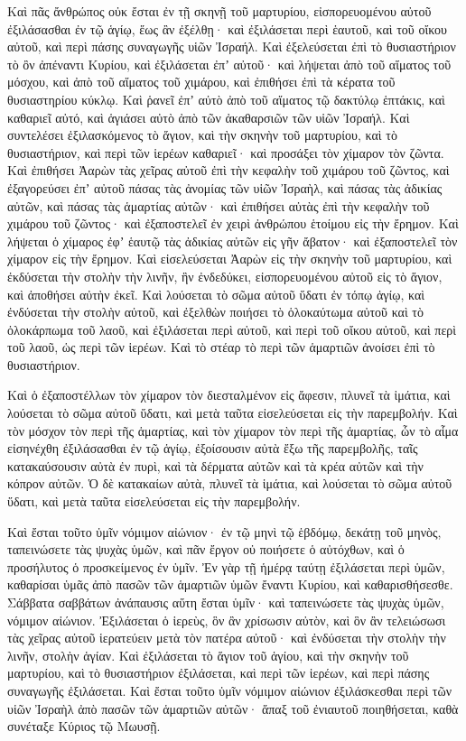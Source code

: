 {Καὶ πᾶς ἄνθρώπος οὐκ ἔσται ἐν τῇ σκηνῇ τοῦ μαρτυρίου, εἰσπορευομένου αὐτοῦ ἐξιλάσασθαι ἐν τῷ ἁγίῳ, ἕως ἂν ἐξέλθῃ· καὶ ἐξιλάσεται περὶ ἑαυτοῦ, καὶ τοῦ οἴκου αὐτοῦ, καὶ περὶ πάσης συναγωγῆς υἱῶν Ἰσραήλ.
Καὶ ἐξελεύσεται ἐπὶ τὸ θυσιαστήριον τὸ ὂν ἀπέναντι Κυρίου, καὶ ἐξιλάσεται ἐπʼ αὐτοῦ· καὶ λήψεται ἀπὸ τοῦ αἵματος τοῦ μόσχου, καὶ ἀπὸ τοῦ αἵματος τοῦ χιμάρου, καὶ ἐπιθήσει ἐπὶ τὰ κέρατα τοῦ θυσιαστηρίου κύκλῳ.
Καὶ ῥανεῖ ἐπʼ αὐτὸ ἀπὸ τοῦ αἵματος τῷ δακτύλῳ ἑπτάκις, καὶ καθαριεῖ αὐτό, καὶ ἁγιάσει αὐτὸ ἀπὸ τῶν ἀκαθαρσιῶν τῶν υἱῶν Ἰσραήλ.
Καὶ συντελέσει ἐξιλασκόμενος τὸ ἅγιον, καὶ τὴν σκηνὴν τοῦ μαρτυρίου, καὶ τὸ θυσιαστήριον, καὶ περὶ τῶν ἱερέων καθαριεῖ· καὶ προσάξει τὸν χίμαρον τὸν ζῶντα.
Καὶ ἐπιθήσει Ἀαρὼν τὰς χεῖρας αὐτοῦ ἐπὶ τὴν κεφαλὴν τοῦ χιμάρου τοῦ ζῶντος, καὶ ἐξαγορεύσει ἐπʼ αὐτοῦ πάσας τὰς ἀνομίας τῶν υἱῶν Ἰσραὴλ, καὶ πάσας τὰς ἀδικίας αὐτῶν, καὶ πάσας τὰς ἁμαρτίας αὐτῶν· καὶ ἐπιθήσει αὐτὰς ἐπὶ τὴν κεφαλὴν τοῦ χιμάρου τοῦ ζῶντος· καὶ ἐξαποστελεῖ ἐν χειρὶ ἀνθρώπου ἑτοίμου εἰς τὴν ἔρημον.
Καὶ λήψεται ὁ χίμαρος ἐφʼ ἑαυτῷ τὰς ἀδικίας αὐτῶν εἰς γῆν ἄβατον· καὶ ἐξαποστελεῖ τὸν χίμαρον εἰς τὴν ἔρημον.
Καὶ εἰσελεύσεται Ἀαρὼν εἰς τὴν σκηνὴν τοῦ μαρτυρίου, καὶ ἐκδύσεται τὴν στολὴν τὴν λινῆν, ἣν ἐνδεδύκει, εἰσπορευομένου αὐτοῦ εἰς τὸ ἅγιον, καὶ ἀποθήσει αὐτὴν ἐκεῖ.
Καὶ λούσεται τὸ σῶμα αὐτοῦ ὕδατι ἐν τόπῳ ἁγίῳ, καὶ ἐνδύσεται τὴν στολὴν αὐτοῦ, καὶ ἐξελθὼν ποιήσει τὸ ὁλοκαύτωμα αὐτοῦ καὶ τὸ ὁλοκάρπωμα τοῦ λαοῦ, καὶ ἐξιλάσεται περὶ αὐτοῦ, καὶ περὶ τοῦ οἴκου αὐτοῦ, καὶ περὶ τοῦ λαοῦ, ὡς περὶ τῶν ἱερέων.
Καὶ τὸ στέαρ τὸ περὶ τῶν ἁμαρτιῶν ἀνοίσει ἐπὶ τὸ θυσιαστήριον.
\par }{\PP {}Καὶ ὁ ἐξαποστέλλων τὸν χίμαρον τὸν διεσταλμένον εἰς ἄφεσιν, πλυνεῖ τὰ ἱμάτια, καὶ λούσεται τὸ σῶμα αὐτοῦ ὕδατι, καὶ μετὰ ταῦτα εἰσελεύσεται εἰς τὴν παρεμβολήν.
Καὶ τὸν μόσχον τὸν περὶ τῆς ἁμαρτίας, καὶ τὸν χίμαρον τὸν περὶ τῆς ἁμαρτίας, ὧν τὸ αἷμα εἰσηνέχθη ἐξιλάσασθαι ἐν τῷ ἁγίῳ, ἐξοίσουσιν αὐτὰ ἔξω τῆς παρεμβολῆς, ταῖς κατακαύσουσιν αὐτὰ ἐν πυρὶ, καὶ τὰ δέρματα αὐτῶν καὶ τὰ κρέα αὐτῶν καὶ τὴν κόπρον αὐτῶν.
Ὁ δὲ κατακαίων αὐτὰ, πλυνεῖ τὰ ἱμάτια, καὶ λούσεται τὸ σῶμα αὐτοῦ ὕδατι, καὶ μετὰ ταῦτα εἰσελεύσεται εἰς τὴν παρεμβολήν.
\par }{\PP {}Καὶ ἔσται τοῦτο ὑμῖν νόμιμον αἰώνιον· ἐν τῷ μηνὶ τῷ ἑβδόμῳ, δεκάτῃ τοῦ μηνὸς, ταπεινώσετε τὰς ψυχὰς ὑμῶν, καὶ πᾶν ἔργον οὐ ποιήσετε ὁ αὐτόχθων, καὶ ὁ προσήλυτος ὁ προσκείμενος ἐν ὑμῖν.
Ἐν γὰρ τῇ ἡμέρᾳ ταύτῃ ἐξιλάσεται περὶ ὑμῶν, καθαρίσαι ὑμᾶς ἀπὸ πασῶν τῶν ἁμαρτιῶν ὑμῶν ἔναντι Κυρίου, καὶ καθαρισθήσεσθε.
Σάββατα σαββάτων ἀνάπαυσις αὕτη ἔσται ὑμῖν· καὶ ταπεινώσετε τὰς ψυχὰς ὑμῶν, νόμιμον αἰώνιον.
Ἐξιλάσεται ὁ ἱερεὺς, ὃν ἂν χρίσωσιν αὐτὸν, καὶ ὃν ἂν τελειώσωσι τὰς χεῖρας αὐτοῦ ἱερατεύειν μετὰ τὸν πατέρα αὐτοῦ· καὶ ἐνδύσεται τὴν στολὴν τὴν λινῆν, στολὴν ἁγίαν.
Καὶ ἐξιλάσεται τὸ ἅγιον τοῦ ἁγίου, καὶ τὴν σκηνὴν τοῦ μαρτυρίου, καὶ τὸ θυσιαστήριον ἐξιλάσεται, καὶ περὶ τῶν ἱερέων, καὶ περὶ πάσης συναγωγῆς ἐξιλάσεται.
Καὶ ἔσται τοῦτο ὑμῖν νόμιμον αἰώνιον ἐξιλάσκεσθαι περὶ τῶν υἱῶν Ἰσραὴλ ἀπὸ πασῶν τῶν ἁμαρτιῶν αὐτῶν· ἅπαξ τοῦ ἐνιαυτοῦ ποιηθήσεται, καθὰ συνέταξε Κύριος τῷ Μωυσῇ.

}

